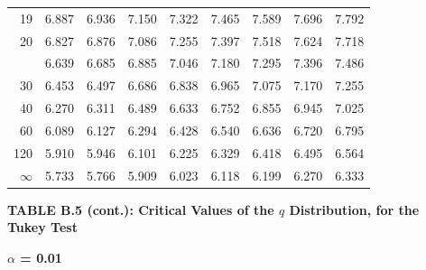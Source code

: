 \documentclass[10pt]{article}
\begin{document}
\begin{longtable}{@{}r!{\vrule width 0.8pt\hspace{0.55em}}rrrrrrrr@{}}
19 & 6.887 & 6.936 & 7.150 & 7.322 & 7.465 & 7.589 & 7.696 & 7.792 \\
20 & 6.827 & 6.876 & 7.086 & 7.255 & 7.397 & 7.518 & 7.624 & 7.718 \\
 & 6.639 & 6.685 & 6.885 & 7.046 & 7.180 & 7.295 & 7.396 & 7.486 \\
30 & 6.453 & 6.497 & 6.686 & 6.838 & 6.965 & 7.075 & 7.170 & 7.255 \\
40 & 6.270 & 6.311 & 6.489 & 6.633 & 6.752 & 6.855 & 6.945 & 7.025 \\
60 & 6.089 & 6.127 & 6.294 & 6.428 & 6.540 & 6.636 & 6.720 & 6.795 \\
120 & 5.910 & 5.946 & 6.101 & 6.225 & 6.329 & 6.418 & 6.495 & 6.564 \\
\addlinespace[0.30em]
$\infty$ & 5.733 & 5.766 & 5.909 & 6.023 & 6.118 & 6.199 & 6.270 & 6.333 \\
\end{longtable}
\newpage
\thispagestyle{empty}
\begin{center}
{\large\bfseries TABLE B.5 (cont.): Critical Values of the $q$ Distribution, for the Tukey Test\par}
\end{center}
{\large\bfseries $\alpha$ = 0.01\par}
\vspace{0.45em}
\small
\end{document}
